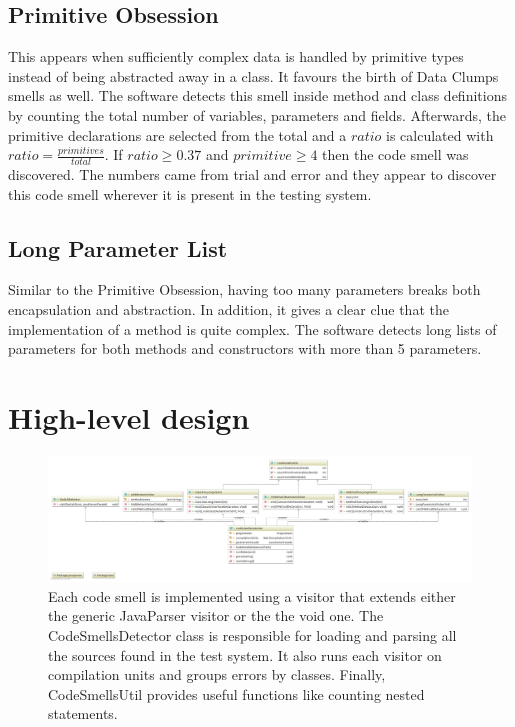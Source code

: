 \documentclass[a4paper]{article}
\begin{document}
\subsection{Primitive Obsession}
This appears when sufficiently complex data is handled by primitive types
instead of being abstracted away in a class.
It favours the birth of Data Clumps smells as well.
The software detects this smell inside method and class 
definitions by
counting the total number of variables, parameters and fields.
Afterwards, the primitive declarations are selected from the total and a $ratio$
is calculated with $ratio=\frac{primitives}{total}$.
If $ratio \geq 0.37$ and $primitive \geq 4$ then the code smell was discovered.
The numbers came from trial and error and they appear to discover this
code smell wherever it is present in the testing system.

\subsection{Long Parameter List}
Similar to the Primitive Obsession, having too many parameters breaks both
encapsulation and abstraction.
In addition, it gives a clear clue that the implementation
of a method is quite complex.
The software detects long lists of parameters for both methods and constructors
with more than 5 parameters.

\section{High-level design}

\begin{figure}
	\includegraphics[width=\textwidth]{codesmellspng}
	\caption{Each code smell is implemented using a visitor that extends either
		the generic JavaParser visitor or the the void one.
		The CodeSmellsDetector class is responsible for loading and parsing all
		the sources found in the test system.
		It also runs each visitor on compilation units and
		groups errors by classes.
		Finally, CodeSmellsUtil provides useful functions like counting
		nested statements.}
\end{figure}
\end{document}
